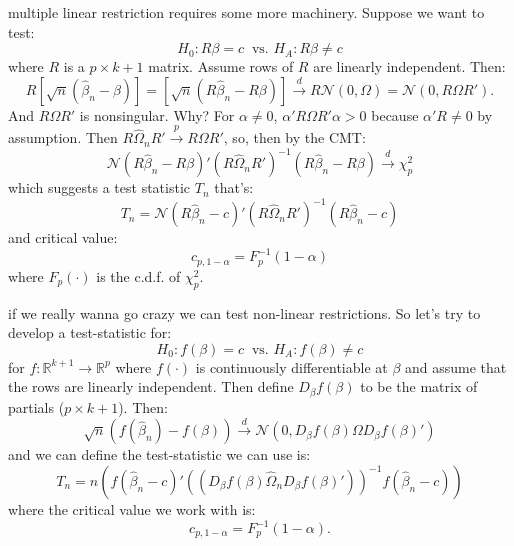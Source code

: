 \documentclass{tufte-book}
\theoremstyle{mytheoremstyle}
\theoremstyle{mylemstyle}
\theoremstyle{mydefstyle}
\begin{document}
 multiple linear restriction requires some more machinery. Suppose we want to test:
	\[H_0: R\beta=c\ \text{ vs. } H_A: R\beta \ne c\]
where \(R\) is a \(p \times k+1\) matrix. Assume rows of \(R\) are linearly independent. Then:
	\[R[\sqrt{n}(\hat{\beta}_n - \beta)] = [\sqrt{n}(R\hat{\beta}_n - R\beta)] \overset{d}{\rightarrow} R\mathcal{N}(0, \Omega) = \mathcal{N}(0, R\Omega R') \text{.}\]
And \(R\Omega R'\) is nonsingular. Why? For \(\alpha \ne 0\), \(\alpha'R\Omega R' \alpha > 0\) because \(\alpha' R \ne 0\) by assumption. Then \(R\hat{\Omega}_n R' \overset{p}{\rightarrow} R \Omega R'\), so, then by the CMT:
	\[\mathcal{N}(R\hat{\beta}_n - R \beta)'(R\hat{\Omega}_n R')^{-1}(R\hat{\beta}_n - R\beta) \overset{d}{\rightarrow} \chi_p^2\]
which suggests a test statistic \(T_n\) that's:
	\[T_n = \mathcal{N}(R\hat{\beta}_n - c)'(R\hat{\Omega}_n R')^{-1}(R\hat{\beta}_n - c)\]
and critical value:
	\[c_{p, 1-\alpha} = F_p^{-1}(1-\alpha)\]
where \(F_p(\cdot)\) is the c.d.f. of \(\chi_p^2\). 

 if we really wanna go crazy we can test non-linear restrictions. So let's try to develop a test-statistic for:
	\[H_0: f(\beta) = c\ \text{ vs. } H_A: f(\beta) \ne c\]
for \(f:\mathbb{R}^{k+1} \rightarrow \mathbb{R}^p\) where \(f(\cdot)\) is continuously differentiable at \(\beta\) and assume that the rows are linearly independent. Then define \(D_\beta f(\beta)\) to be the matrix of partials (\(p \times k+1\)). Then:
	\[\sqrt{n}(f(\hat{\beta}_n) - f(\beta)) \overset{d}{\rightarrow} \mathcal{N}(0, D_\beta f(\beta) \Omega D_\beta f(\beta)')\]
and we can define the test-statistic we can use is:
	\[T_n = n (f(\hat{\beta}_n - c)'((D_\beta f(\beta) \hat{\Omega}_n D_\beta f(\beta)'))^{-1} f(\hat{\beta}_n - c))\]
where the critical value we work with is:
	\[c_{p, 1-\alpha} = F_p^{-1}(1-\alpha)\text{.}\]
\end{document}

